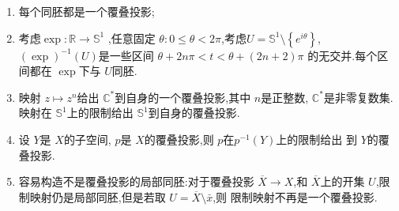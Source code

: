 \documentclass[../../几何与拓扑.tex]{subfiles}
\begin{document}
\begin{example}[  覆叠空间]\label{exp:3.17-1}
    \begin{enumerate}
        \item 每个同胚都是一个覆叠投影;
        \item  考虑\(  \exp :\mathbb{R} \to \mathbb{S}^{1}  \) ,任意固定 \(   \theta : 0\le  \theta <2\pi   \),考虑\(  U= \mathbb{S}^{1}\setminus \left\{ e^{i \theta } \right\}  \), \(  \left( \exp  \right)^{-1} \left( U \right)    \)是一些区间 \(   \theta + 2n\pi <t< \theta + \left( 2n+ 2 \right)\pi    \) 的无交并.每个区间都在 \(  \exp   \)下与 \( U  \)同胚.
        \item 映射 \(  z\mapsto z^{n}  \)给出 \(  \mathbb{C} ^{*}  \)到自身的一个覆叠投影,其中 \(  n  \)是正整数, \(  \mathbb{C} ^{*}  \)是非零复数集.映射在 \(  \mathbb{S}^{1}  \)上的限制给出 \(  \mathbb{S}^{1}  \)到自身的覆叠投影. 
        \item 设 \(  Y  \)是 \(  X  \)的子空间, \(  p  \)是  \(  X  \)的覆叠投影,则 \(  p  \)在\(  p ^{-1} \left( Y \right)   \)上的限制给出 到 \(  Y  \)的覆叠投影.
        \item 容易构造不是覆叠投影的局部同胚:对于覆叠投影 \(  \overline{X}\to X  \),和 \(  \overline{X}  \)上的开集 \(  U  \),限制映射仍是局部同胚,但是若取 \(  U = \overline{X}\setminus  \bar{x}  \),则 限制映射不再是一个覆叠投影.                     
    \end{enumerate}
    
\end{example}

\hspace*{\fill} 
\end{document}
